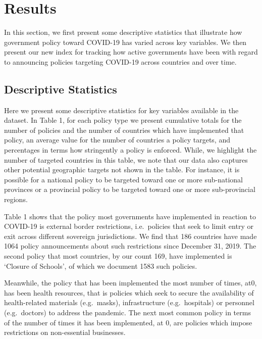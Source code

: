 \documentclass[]{article}
\begin{document}
\hypertarget{results}{%
\section*{Results}\label{results}}

In this section, we first present some descriptive statistics that illustrate how government policy toward COVID-19 has varied across key variables. We then present our new index for tracking how active governments have been with regard to announcing policies targeting COVID-19 across countries and over time.

\hypertarget{descriptive-statistics}{%
\subsection*{Descriptive Statistics}\label{descriptive-statistics}}

Here we present some descriptive statistics for key variables available in the dataset. In Table 1, for each policy type we present cumulative totals for the number of policies and the number of countries which have implemented that policy, an average value for the number of countries a policy targets, and percentages in terms how stringently a policy is enforced. While, we highlight the number of targeted countries in this table, we note that our data also captures other potential geographic targets not shown in the table. For instance, it is possible for a national policy to be targeted toward one or more sub-national provinces or a provincial policy to be targeted toward one or more sub-provincial regions.

Table 1 shows that the policy most governments have implemented in reaction to COVID-19 is external border restrictions, i.e.~policies that seek to limit entry or exit across different sovereign jurisdictions. We find that 186 countries have made 1064 policy announcements about such restrictions since December 31, 2019. The second policy that most countries, by our count 169, have implemented is `Closure of Schools', of which we document 1583 such policies.

Meanwhile, the policy that has been implemented the most number of times, at0, has been health resources, that is policies which seek to secure the availability of health-related materials (e.g.~masks), infrastructure (e.g.~hospitals) or personnel (e.g.~doctors) to address the pandemic. The next most common policy in terms of the number of times it has been implemented, at 0, are policies which impose restrictions on non-essential businesses.
\end{document}
